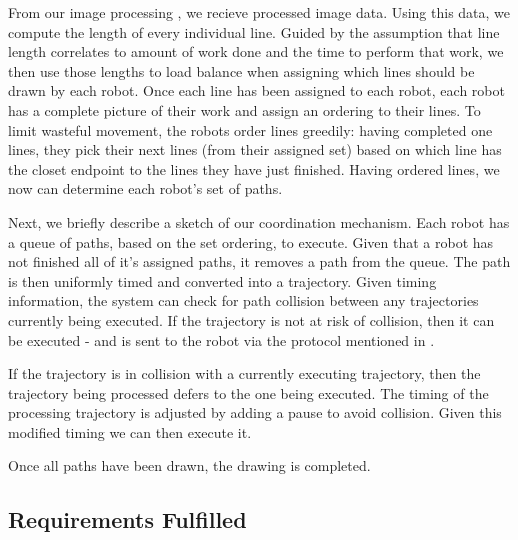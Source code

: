 From our image processing , we recieve processed image data. 
Using this data, we compute the length of every individual line. 
Guided by the assumption that line length correlates to amount of work done and the time to perform that work, we then use those lengths to load balance when assigning which lines should be drawn by each robot. 
Once each line has been assigned to each robot, each robot has a complete picture of their work and assign an ordering to their lines. 
To limit wasteful movement, the robots order lines greedily: having completed one lines, they pick their next lines (from their assigned set) based on which line has the closet endpoint to the lines they have just finished. 
Having ordered lines, we now can determine each robot's set of paths. 

Next, we briefly describe a sketch of our coordination mechanism. Each robot has a queue of paths, based on the set ordering, to execute.
Given that a robot has not finished all of it's assigned paths, it removes a path from the queue.
The path is then uniformly timed and converted into a trajectory.
Given timing information, the system can check for path collision between any trajectories currently being executed.
If the trajectory is not at risk of collision, then it can be executed - and is sent to the robot via the protocol mentioned in . 

If the trajectory is in collision with a currently executing trajectory, then the trajectory being processed defers to the one being executed. 
The timing of the processing trajectory is adjusted by adding a pause to avoid collision. Given this modified timing we can then execute it. 

Once all paths have been drawn, the drawing is completed.

\subsection{Requirements Fulfilled}
